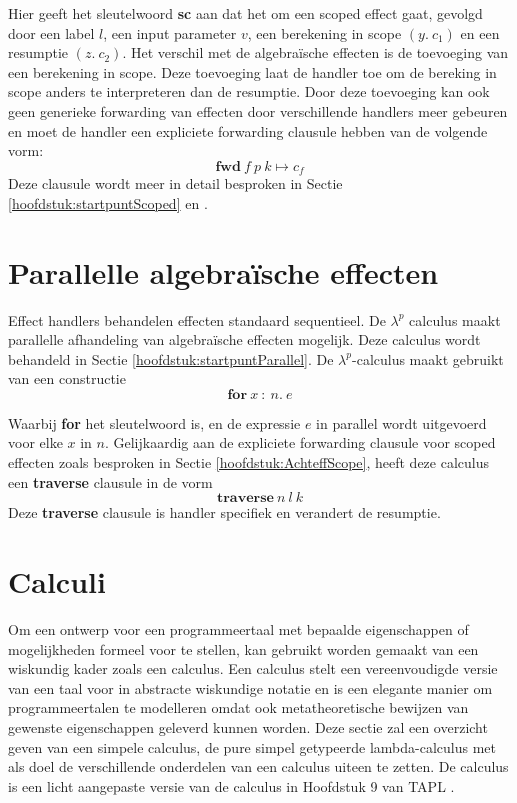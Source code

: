 Hier geeft het sleutelwoord \textbf{sc} aan dat het om een scoped effect gaat, gevolgd door een label $l$, een input parameter $v$, een berekening in scope $(y.\:c_{1})$ en een resumptie $(z.\:c_{2})$. Het verschil met de algebraïsche effecten is de toevoeging van een berekening in scope. Deze toevoeging laat de handler toe om de bereking in scope anders te interpreteren dan de resumptie. Door deze toevoeging kan ook geen generieke forwarding van effecten door verschillende handlers meer gebeuren en moet de handler een expliciete forwarding clausule hebben van de volgende vorm:
\begin{equation}
    \textbf{fwd}\:f\:p\:k \mapsto c_{f}
\end{equation}
Deze clausule wordt meer in detail besproken in Sectie \ref{hoofdstuk:startpuntScoped} en \cite{Bosman2022}.


\section{Parallelle algebraïsche effecten}
Effect handlers behandelen effecten standaard sequentieel. De $\lambda^{p}$ calculus \cite{Xie2021} maakt parallelle afhandeling van algebraïsche effecten mogelijk. Deze calculus wordt behandeld in Sectie \ref{hoofdstuk:startpuntParallel}. De $\lambda^{p}$-calculus maakt gebruikt van een constructie 
\begin{equation}
    \textbf{for}\:x\::\:n.\:e
\end{equation}

Waarbij \textbf{for} het sleutelwoord is, en de expressie $e$ in parallel wordt uitgevoerd voor elke $x$ in $n$. Gelijkaardig aan de expliciete forwarding clausule voor scoped effecten zoals besproken in Sectie \ref{hoofdstuk:AchteffScope}, heeft deze calculus een \textbf{traverse} clausule in de vorm
\begin{equation}
    \textbf{traverse}\:n\:l\:k
\end{equation}
Deze \textbf{traverse} clausule is handler specifiek en verandert de resumptie.

\section{Calculi}
Om een ontwerp voor een programmeertaal met bepaalde eigenschappen of mogelijkheden formeel voor te stellen, kan gebruikt worden gemaakt van een wiskundig kader zoals een calculus. Een calculus stelt een vereenvoudigde versie van een taal voor in abstracte wiskundige notatie en is een elegante manier om programmeertalen te modelleren omdat ook metatheoretische bewijzen van gewenste eigenschappen geleverd kunnen worden. Deze sectie zal een overzicht geven van een simpele calculus, de pure simpel getypeerde lambda-calculus met als doel de verschillende onderdelen van een calculus uiteen te zetten. De calculus is een licht aangepaste versie van de calculus in Hoofdstuk 9 van TAPL \cite{Pierce2002}.

